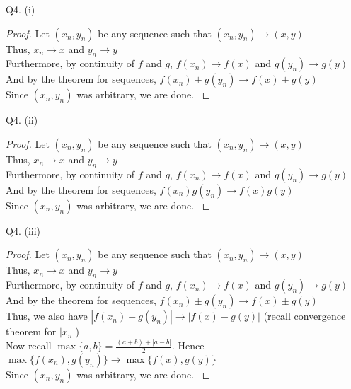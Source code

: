 \documentclass[handout,aspectratio=169]{beamer}
\newcommand{\norm}[1]{|#1|}
\begin{document}
\begin{frame}{Q4. (i)}
\begin{proof}
     {
        Let $(x_n,y_n)$ be any sequence such that $(x_n,y_n) \to (x,y)$\\[1mm]
    }
     {
        Thus, $x_n \to x$ and $y_n \to y$\\[1mm]
    }
     {
        Furthermore, by continuity of $f$ and $g$, $f(x_n) \to f(x)$ and $g(y_n) \to g(y)$\\[1mm]
    }
     {
        And by the theorem for sequences, $f(x_n)\pm g(y_n) \to f(x)\pm g(y)$\\[1mm]
    }
     {
        Since $(x_n,y_n)$ was arbitrary, we are done.
    }
\end{proof}
\end{frame}

\begin{frame}{Q4. (ii)}
\begin{proof}
     {
        Let $(x_n,y_n)$ be any sequence such that $(x_n,y_n) \to (x,y)$\\[1mm]
    }
     {
        Thus, $x_n \to x$ and $y_n \to y$\\[1mm]
    }
     {
        Furthermore, by continuity of $f$ and $g$, $f(x_n) \to f(x)$ and $g(y_n) \to g(y)$\\[1mm]
    }
     {
        And by the theorem for sequences, $f(x_n)g(y_n) \to f(x)g(y)$\\[1mm]
    }
     {
        Since $(x_n,y_n)$ was arbitrary, we are done.
    }
\end{proof}
\end{frame}

\begin{frame}{Q4. (iii)}
\begin{proof}
     {
        Let $(x_n,y_n)$ be any sequence such that $(x_n,y_n) \to (x,y)$\\[1mm]
    }
     {
        Thus, $x_n \to x$ and $y_n \to y$\\[1mm]
    }
     {
        Furthermore, by continuity of $f$ and $g$, $f(x_n) \to f(x)$ and $g(y_n) \to g(y)$\\[1mm]
    }
     {
        And by the theorem for sequences, $f(x_n)\pm g(y_n) \to f(x)\pm g(y)$\\[1mm]
    }
     {
        Thus, we also have $\norm{f(x_n)-g(y_n)} \to \norm{f(x)-g(y)}$ (recall convergence theorem for $\norm{x_n}$)\\[1mm]
    }
     {
        Now recall $\max\{a,b\} = \frac{(a+b)+|a-b|}{2}$. Hence $\max\{f(x_n),g(y_n)\} \to \max\{f(x),g(y)\}$\\[1mm]
    }
     {
        Since $(x_n,y_n)$ was arbitrary, we are done.
    }
\end{proof}
\end{frame}
\end{document}
